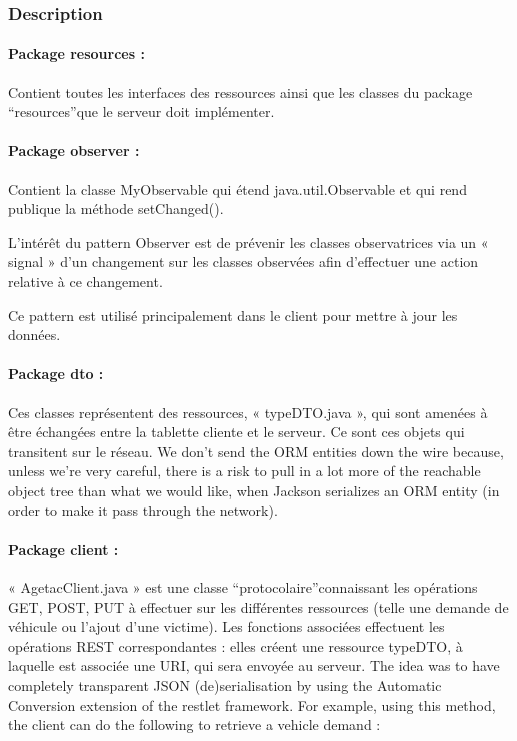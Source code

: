 \documentclass{article}
\begin{document}
\subsubsection{Description}

\paragraph{Package resources :}

Contient toutes les interfaces des ressources ainsi que les classes 
du package ``resources''que le serveur doit implémenter.

\paragraph{Package observer :}

Contient la classe MyObservable qui étend java.util.Observable 
et qui rend publique la méthode setChanged().

L'intérêt du pattern Observer est de prévenir les classes observatrices 
via un « signal » d'un changement sur les classes observées afin d'effectuer 
une action relative à ce changement.

Ce pattern est utilisé principalement dans le client pour mettre 
à jour les données.

\paragraph{Package dto :}

Ces classes représentent des ressources, « typeDTO.java », 
qui sont amenées à être échangées entre la tablette cliente et le serveur. 
Ce sont ces objets qui transitent sur le réseau. We don't send the ORM entities 
down the wire because, unless we're very careful, there is a risk to pull in a 
lot more of the reachable object tree than what we would like, when Jackson serializes 
an ORM entity (in order to make it pass through the network).

\paragraph{Package client :}

« AgetacClient.java » est une classe ``protocolaire''connaissant 
les opérations GET, POST, PUT à effectuer sur les différentes ressources (telle 
une demande de véhicule ou l'ajout d'une victime). Les fonctions associées effectuent 
les opérations REST correspondantes : elles créent une ressource typeDTO, à 
laquelle est associée une URI, qui sera envoyée au serveur. The idea was to have 
completely transparent JSON (de)serialisation by using the Automatic 
Conversion extension of the restlet framework. For example, 
using this method, the client can do the following to retrieve a vehicle demand :
%
\end{document}
